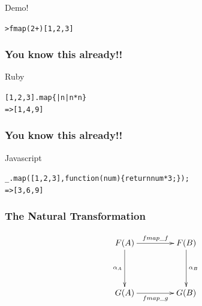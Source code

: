 \documentclass[12pt, xcolor=table]{beamer}
\begin{document}
\begin{frame}{Demo!}
        \begin{alltt}
            > fmap (2 +) [1,2,3]
        \end{alltt}
\end{frame}

\begin{frame}
    \frametitle{You know this already!!}
    \begin{block}{Ruby}
        \begin{alltt}
            [1, 2, 3].map \{ |n| n * n \}
            \newline
            \newline
            => [1, 4, 9]
        \end{alltt}
    \end{block}
\end{frame}

\begin{frame}
    \frametitle{You know this already!!}
    \begin{block}{Javascript}
        \begin{alltt}
            \_.map([1, 2, 3], function(num)\{return num*3;\});
            \newline
            \newline
            => [3, 6, 9]
        \end{alltt}
    \end{block}
\end{frame}

\begin{frame}
    \frametitle{The Natural Transformation}
            \begin{equation*}
                   \xymatrix@C+2em@R+2em{
                      F(A) \ar[r]^{fmap\_f} \ar[d]_{\alpha_A} & F(B) \ar[d]^{\alpha_B} \\
                      G(A) \ar[r]_{fmap\_g} & G(B)
                     }
            \end{equation*}


\end{frame}
\end{document}
